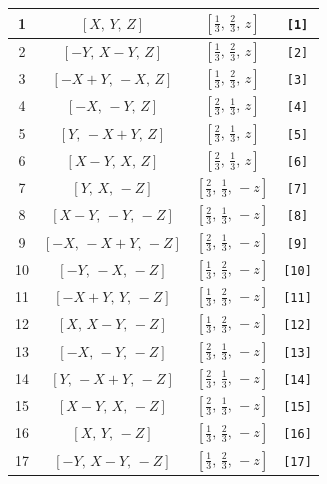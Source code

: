 \documentclass[fleqn,8pt]{jsarticle}
\begin{document}
\begin{longtable}{cccc}
1 & $\left[ X,\, Y,\, Z \right]$ & $\left[ \frac{1}{3},\, \frac{2}{3},\, z \right]$ & {\tt [1]} \\ \hline
2 & $\left[ - Y,\, X - Y,\, Z \right]$ & $\left[ \frac{1}{3},\, \frac{2}{3},\, z \right]$ & {\tt [2]} \\ \hline
3 & $\left[ - X + Y,\, - X,\, Z \right]$ & $\left[ \frac{1}{3},\, \frac{2}{3},\, z \right]$ & {\tt [3]} \\ \hline
4 & $\left[ - X,\, - Y,\, Z \right]$ & $\left[ \frac{2}{3},\, \frac{1}{3},\, z \right]$ & {\tt [4]} \\ \hline
5 & $\left[ Y,\, - X + Y,\, Z \right]$ & $\left[ \frac{2}{3},\, \frac{1}{3},\, z \right]$ & {\tt [5]} \\ \hline
6 & $\left[ X - Y,\, X,\, Z \right]$ & $\left[ \frac{2}{3},\, \frac{1}{3},\, z \right]$ & {\tt [6]} \\ \hline
7 & $\left[ Y,\, X,\, - Z \right]$ & $\left[ \frac{2}{3},\, \frac{1}{3},\, - z \right]$ & {\tt [7]} \\ \hline
8 & $\left[ X - Y,\, - Y,\, - Z \right]$ & $\left[ \frac{2}{3},\, \frac{1}{3},\, - z \right]$ & {\tt [8]} \\ \hline
9 & $\left[ - X,\, - X + Y,\, - Z \right]$ & $\left[ \frac{2}{3},\, \frac{1}{3},\, - z \right]$ & {\tt [9]} \\ \hline
10 & $\left[ - Y,\, - X,\, - Z \right]$ & $\left[ \frac{1}{3},\, \frac{2}{3},\, - z \right]$ & {\tt [10]} \\ \hline
11 & $\left[ - X + Y,\, Y,\, - Z \right]$ & $\left[ \frac{1}{3},\, \frac{2}{3},\, - z \right]$ & {\tt [11]} \\ \hline
12 & $\left[ X,\, X - Y,\, - Z \right]$ & $\left[ \frac{1}{3},\, \frac{2}{3},\, - z \right]$ & {\tt [12]} \\ \hline
13 & $\left[ - X,\, - Y,\, - Z \right]$ & $\left[ \frac{2}{3},\, \frac{1}{3},\, - z \right]$ & {\tt [13]} \\ \hline
14 & $\left[ Y,\, - X + Y,\, - Z \right]$ & $\left[ \frac{2}{3},\, \frac{1}{3},\, - z \right]$ & {\tt [14]} \\ \hline
15 & $\left[ X - Y,\, X,\, - Z \right]$ & $\left[ \frac{2}{3},\, \frac{1}{3},\, - z \right]$ & {\tt [15]} \\ \hline
16 & $\left[ X,\, Y,\, - Z \right]$ & $\left[ \frac{1}{3},\, \frac{2}{3},\, - z \right]$ & {\tt [16]} \\ \hline
17 & $\left[ - Y,\, X - Y,\, - Z \right]$ & $\left[ \frac{1}{3},\, \frac{2}{3},\, - z \right]$ & {\tt [17]} \\ \hline

\end{longtable}
\end{document}
